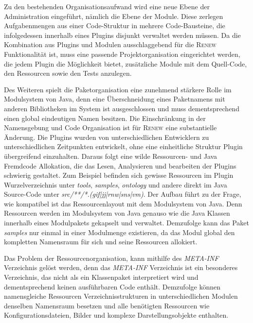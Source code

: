		Zu den bestehenden Organisationsaufwand wird eine neue Ebene der Administration eingeführt, nämlich die Ebene der Module. Diese zerlegen Aufgabenmengen aus einer Code-Struktur in mehrere Code-Bausteine, die infolgedessen innerhalb eines Plugins disjunkt verwaltet werden müssen.\newline
		Da die Kombination aus Plugins und Modulen ausschlaggebend für die \textsc{Renew} Funktionalität ist, muss eine passende Projektorganisation eingerichtet werden, die jedem Plugin die Möglichkeit bietet, zusätzliche Module mit dem Quell-Code, den Ressourcen sowie den Tests anzulegen.\bigbreak

		Des Weiteren spielt die Paketorganisation eine zunehmend stärkere Rolle im Modulsystem von Java, denn eine Überschneidung eines Paketnamens mit anderen Bibliotheken im System ist ausgeschlossen und muss dementsprechend einen global eindeutigen Namen besitzen. \newline
		Die Einschränkung in der Namensgebung und Code Organisation ist für \textsc{Renew} eine substantielle Änderung. Die Plugins wurden von unterschiedlichen Entwicklern zu unterschiedlichen Zeitpunkten entwickelt, ohne eine einheitliche Struktur Plugin übergreifend einzuhalten. Daraus folgt eine wilde Ressourcen- und Java Fremdcode Allokation, die das Lesen, Analysieren und bearbeiten der Plugins schwierig gestaltet. Zum Beispiel befinden sich gewisse Ressourcen im Plugin Wurzelverzeichnis unter \textit{tools}, \textit{samples}, \textit{ontology} und andere direkt im Java Source-Code unter \textit{src/**/*.(gif|jj|rnw|sns|vm)}. Der Aufbau führt zu der Frage, wie kompatibel ist das Ressourcenlayout mit dem Modulsystem von Java. Denn Ressourcen werden im Modulsystem von Java genauso wie die Java Klassen innerhalb eines Modulpakets gekapselt und verwaltet. Demzufolge kann das Paket \textit{samples} nur einmal in einer Modulmenge existieren, da das Modul global den kompletten Namensraum für sich und seine Ressourcen allokiert. \bigbreak 

		Das Problem der Ressourcenorganisation, kann mithilfe des \textit{META-INF} Verzeichnis gelöst werden, denn das \textit{META-INF} Verzeichnis ist ein besonderes Verzeichnis, das nicht als ein Klassenpaket interpretiert wird und dementsprechend keinen ausführbaren Code enthält. Demzufolge können namensgleiche Ressourcen Verzeichnisstrukturen in unterschiedlichen Modulen denselben Namensraum besetzen und alle benötigten Ressourcen wie Konfigurationsdateien, Bilder und komplexe Darstellungsobjekte enthalten.\bigbreak

